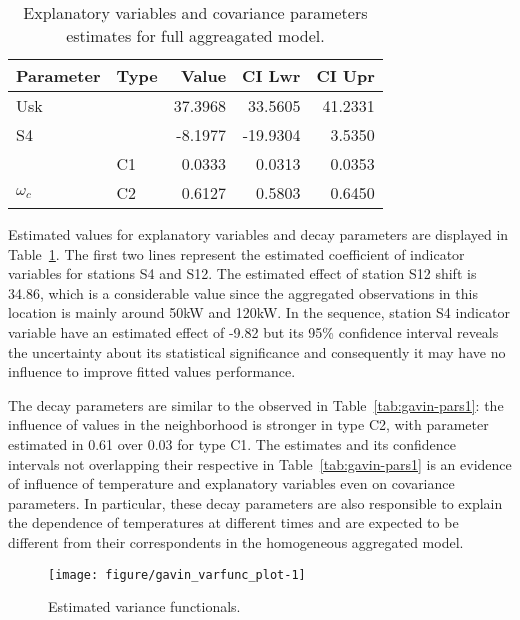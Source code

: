 \begin{table}[b]\centering
\caption{Explanatory variables and covariance parameters estimates for full aggreagated model.}
\label{tab:gavin-pars-fm}  
\begin{knitrout}
\color{fgcolor}
\begin{tabular}{llrrr}
\toprule
Parameter & Type & Value & CI Lwr & CI Upr\\
\midrule
Usk &  & 37.3968 & 33.5605 & 41.2331\\
\cmidrule{1-5}
S4 &  & -8.1977 & -19.9304 & 3.5350\\
\cmidrule{1-5}
 & C1 & 0.0333 & 0.0313 & 0.0353\\

\multirow{-2}{*}{\raggedright\arraybackslash $\omega_c$} & C2 & 0.6127 & 0.5803 & 0.6450\\
\bottomrule
\end{tabular}


\end{knitrout}

\end{table}

Estimated values for explanatory variables and decay parameters are displayed in Table~\ref{tab:gavin-pars-fm}. The first two lines represent the estimated coefficient of indicator variables for stations S4 and S12. The estimated effect of station S12 shift is 34.86, which is a considerable value since the aggregated observations in this location is mainly around 50kW and 120kW. In the sequence, station S4 indicator variable have an estimated effect of -9.82 but its 95\% confidence interval reveals the uncertainty about its statistical significance and consequently  it may have no influence to improve fitted values performance.

The decay parameters are similar to the observed in Table~\ref{tab:gavin-pars1}: the influence of values in the neighborhood is stronger in type C2, with parameter estimated in 0.61 over 0.03 for type C1. The estimates and its confidence intervals not overlapping their respective in Table~\ref{tab:gavin-pars1} is an evidence  of influence of temperature and explanatory variables even on covariance parameters. In particular, these decay parameters are also responsible to explain the dependence of temperatures at different times and are expected to be different from their correspondents in the homogeneous aggregated model.

\begin{figure}[t]\centering
\begin{knitrout}
\color{fgcolor}
\texttt{[image: figure/gavin\_varfunc\_plot-1]} 

\end{knitrout}
\caption{Estimated variance functionals.}
\label{fig:gavin-varfunc}
\end{figure}


